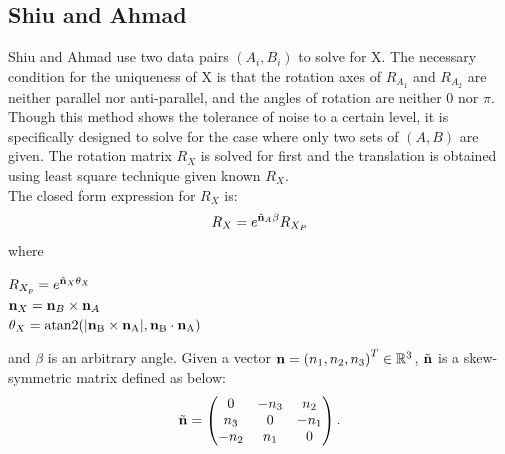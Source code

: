 \documentclass[twocolumn,10pt]{asme2ej}
\newcommand{\nn}{{\bf n}}
\begin{document}
\subsection{Shiu and Ahmad }
Shiu and Ahmad \cite{shiu1987finding,shiu1989calibration} use two data pairs $(A_{i}, B_{i})$ to solve for X. The necessary condition for the uniqueness of X is that the rotation axes of $R_{A_1}$ and $R_{A_2}$ are neither parallel nor anti-parallel, and the angles of rotation are neither 0 nor $\pi$. Though this method shows the tolerance of noise to a certain level, it is specifically designed to solve for the case where only two sets of $(A, B)$ are given. 
The rotation matrix $R_{X}$ is solved for first and the translation is obtained using least square technique given known $R_{X}$.\\

The closed form expression for $R_{X}$ is:
\begin{equation}
R_{X} = e^{\tilde{\nn}_{A}\beta}R_{X_{P}}
\label{RotationCheng}
\end{equation}
where 
\begin{center}
$R_{X_{p}} =  e^{\tilde{\nn}_{X}\theta_{X}}$\\
$\nn_{X} = \nn_{B} \times \nn_{A}$\\
$\theta_{X} = \rm atan2(|\nn_{B} \times \nn_{A}|,\nn_{B} \cdot \nn_{A})$\\
\end{center}
and $\beta$ is an arbitrary angle. Given a vector $\nn = \left( n_{1}, n_{2}, n_{3} \right)^{T} \in \mathbb{R}^{3}$, $\tilde{\nn}$ is a skew-symmetric matrix defined as below:\\
\begin{equation}
\tilde{\nn}
=
\begin{pmatrix}
0 & -n_{3} & n_{2} \\
n_{3} & 0 & -n_{1} \\
-n_{2} & n_{1} & 0
\end{pmatrix}.
\end{equation}
\end{document}
